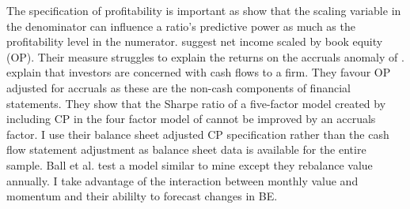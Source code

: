 The specification of profitability is important as \textcite{ball2015deflating}
show that the scaling variable in the denominator can influence a ratio's
predictive power as much as the profitability level in the numerator.
\textcite{fama2006profitability} suggest net income scaled by
book equity (OP).
Their measure struggles to explain the returns on the accruals anomaly of
\textcite{sloan1996stock}.
\textcite{ball2016accruals} explain that investors are concerned with cash
flows to a firm.
They favour OP adjusted for accruals as these are the non-cash components of
financial statements.
They show that the Sharpe ratio of a five-factor model created by including CP
in the four factor model of \textcite{carhart1997persistence} cannot be
improved by an accruals factor.
I use their balance sheet adjusted CP specification rather than the cash flow
statement adjustment as balance sheet data is available for the entire sample.
Ball et al. test a model similar to mine except they rebalance value annually.
I take advantage of the interaction between monthly value and momentum and
their abililty to forecast changes in BE.

